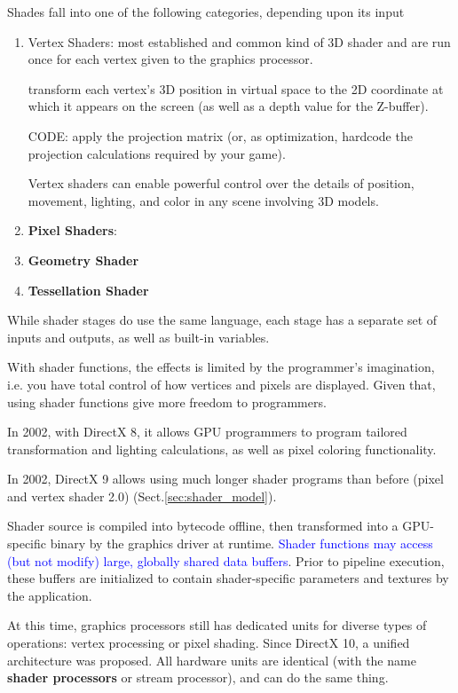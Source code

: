 Shades fall into one of the following categories, depending upon its input
\begin{enumerate}
  \item Vertex Shaders: most established and common kind of 3D shader and are run once for each vertex given to the graphics processor.
  
  transform each vertex's 3D position in virtual space to the 2D coordinate at
  which it appears on the screen (as well as a depth value for the Z-buffer).
  
  CODE: apply the projection matrix (or, as optimization, hardcode the
  projection calculations required by your game).
  
  Vertex shaders can enable powerful control over the details of position,
  movement, lighting, and color in any scene involving 3D models.
  
  \item {\bf Pixel Shaders}: 
  
  \item {\bf Geometry Shader }
  
  \item {\bf Tessellation Shader}
\end{enumerate}
While shader stages do use the same language, each stage has a separate set of
inputs and outputs, as well as built-in variables.

With shader functions, the effects is limited by the programmer's imagination,
i.e. you have total control of how vertices and pixels are displayed. Given
that, using shader functions give more freedom to programmers. 


In 2002, with DirectX 8, it allows GPU programmers to program tailored
transformation and lighting calculations, as well as pixel coloring
functionality.

In 2002, DirectX 9 allows using much longer shader programs than before (pixel
and vertex shader 2.0) (Sect.\ref{sec:shader_model}). 

Shader source is compiled into bytecode offline, then transformed into a
GPU-specific binary by the graphics driver at runtime. \textcolor{blue}{Shader
functions may access (but not modify) large, globally shared data buffers}.
Prior to pipeline execution, these buffers are initialized to contain
shader-specific parameters and textures by the application.

At this time, graphics processors still has dedicated units for diverse types of
operations: vertex processing or pixel shading. Since DirectX 10, a unified
architecture was proposed. All hardware units are identical (with the name {\bf
shader processors} or stream processor), and can do the same thing.

